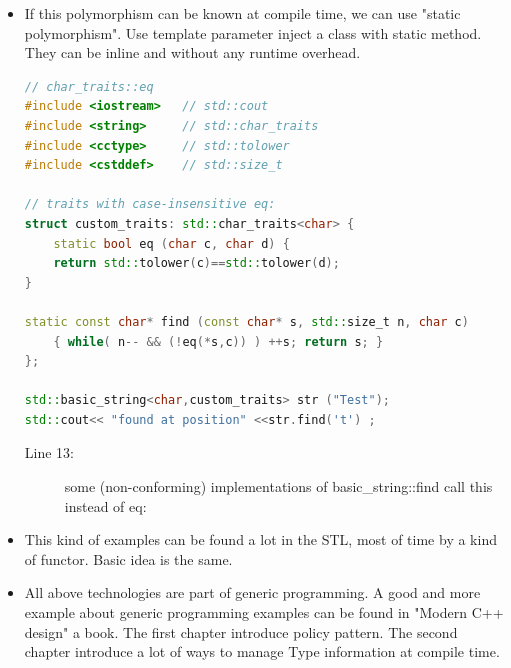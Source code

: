 \documentclass[a4paper,11pt,twoside]{book}
\begin{document}
\begin{itemize}
		\item If this polymorphism can be known at compile time, we can use "static polymorphism". Use template parameter inject a class with static method. They can be inline and without any runtime overhead. 
\begin{lstlisting}[frame=single, language=c++]
// char_traits::eq
#include <iostream>   // std::cout
#include <string>     // std::char_traits
#include <cctype>     // std::tolower
#include <cstddef>    // std::size_t
	
// traits with case-insensitive eq:
struct custom_traits: std::char_traits<char> {
	static bool eq (char c, char d) { 
	return std::tolower(c)==std::tolower(d); 
}
	
static const char* find (const char* s, std::size_t n, char c)
	{ while( n-- && (!eq(*s,c)) ) ++s; return s; }
};
	
std::basic_string<char,custom_traits> str ("Test");
std::cout<< "found at position" <<str.find('t') ;
\end{lstlisting}
\begin{description}
	\item[Line 13:] some (non-conforming) implementations of basic\_string::find call this instead of eq:
\end{description}

	
	\item This kind of examples can be found a lot in the STL, most of time by a kind of functor. Basic idea is the same.
	
	\item All above technologies are part of generic programming. A good and more example about generic programming examples can be found in "Modern C++ design" a book. The first chapter introduce policy pattern. The second chapter introduce a lot of ways to manage Type information at compile time. 
	
\end{itemize}
\end{document}
